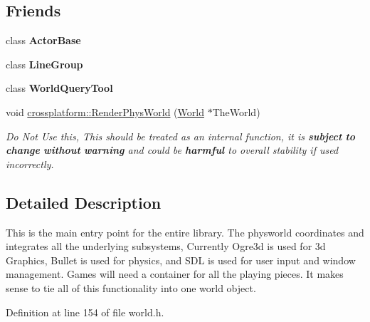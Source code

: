 \subsection*{Friends}
\begin{DoxyCompactItemize}
\item 
\hypertarget{classphys_1_1World_ac09063d4b0192680ba3aa0bd4003a274}{
class {\bfseries ActorBase}}
\label{da/ddf/classphys_1_1World_ac09063d4b0192680ba3aa0bd4003a274}

\item 
\hypertarget{classphys_1_1World_ac3f02140b13e7e7a2c6134b4e7f03d1f}{
class {\bfseries LineGroup}}
\label{da/ddf/classphys_1_1World_ac3f02140b13e7e7a2c6134b4e7f03d1f}

\item 
\hypertarget{classphys_1_1World_a280be5653a2a8825492b77a1e5739796}{
class {\bfseries WorldQueryTool}}
\label{da/ddf/classphys_1_1World_a280be5653a2a8825492b77a1e5739796}

\item 
void \hyperlink{classphys_1_1World_ac7946bdb41c7884bcd7cfdec2b5358f0}{crossplatform::RenderPhysWorld} (\hyperlink{classphys_1_1World}{World} $\ast$TheWorld)
\begin{DoxyCompactList}\small\item\em Do Not Use this, This should be treated as an internal function, it is {\bfseries subject} {\bfseries to} {\bfseries change} {\bfseries without} {\bfseries warning} and could be {\bfseries harmful} to overall stability if used incorrectly. \item\end{DoxyCompactList}\end{DoxyCompactItemize}


\subsection{Detailed Description}
This is the main entry point for the entire library. The physworld coordinates and integrates all the underlying subsystems, Currently Ogre3d is used for 3d Graphics, Bullet is used for physics, and SDL is used for user input and window management. Games will need a container for all the playing pieces. It makes sense to tie all of this functionality into one world object. 

Definition at line 154 of file world.h.



